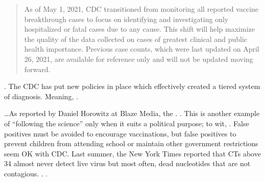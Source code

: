 \begin{refsection}
\begin{tcolorbox}[quote]

\begin{quote}

As of May 1, 2021, CDC transitioned from monitoring all reported vaccine breakthrough cases to focus on identifying and investigating only hospitalized or fatal cases due to any cause. This shift will help maximize the quality of the data collected on cases of greatest clinical and public health importance. Previous case counts, which were last updated on April 26, 2021, are available for reference only and will not be updated moving forward.

\end{quote}

 . The CDC has put new policies in place which effectively created a tiered system of diagnosis. Meaning, .\textsuperscript{\cite{urlrfq3ehgit}}

\end{tcolorbox}

\begin{tcolorbox}[quote]

\dots{}As reported by Daniel Horowitz at Blaze Media,\textsuperscript{\cite{url1af6c096}} the . . This is another example of \enquote{following the science} only when it suits a political purpose; to wit, . False positives must be avoided to encourage vaccinations, but false positives to prevent children from attending school or maintain other government restrictions seem OK with CDC. Last summer, the New York Times reported\textsuperscript{\cite{urla507c2a5}} that CTs above 34 almost never detect live virus but most often, dead nucleotides that are not contagious. . .\textsuperscript{\cite{urlxcvz89h3}}


\end{tcolorbox}
\end{refsection}
